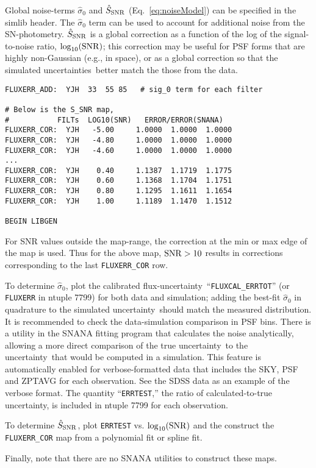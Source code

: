\documentclass[12pt]{article}
\newcommand{\unc}{uncertainty}
\newcommand{\uncs}{uncertainties}
\newcommand{\obs}{observation}
\newcommand{\sigOFF}{\hat\sigma_0}
\newcommand{\SSNR}{\hat{S}_{\rm SNR}}
\newcommand{\logSNR}{\log_{10}({\rm SNR})}
\begin{document}
{Global noise-terms $\sigOFF$ and $\SSNR$ (Eq.~\ref{eq:noiseModel})
can be specified in the simlib header.
The $\sigOFF$ term can be used to account for
additional noise from the SN-photometry.
$\SSNR$ is a global correction as a function of
the log of the signal-to-noise ratio, $\logSNR$;
this correction may be useful for PSF forms
that are highly non-Gaussian (e.g., in space),
or as a global correction so that the simulated
\uncs\ better match the those from the data.

%
\begin{Verbatim}[frame=single]
FLUXERR_ADD:  YJH  33  55 85   # sig_0 term for each filter

# Below is the S_SNR map,
#           FILTs  LOG10(SNR)   ERROR/ERROR(SNANA)
FLUXERR_COR:  YJH   -5.00     1.0000  1.0000  1.0000
FLUXERR_COR:  YJH   -4.80     1.0000  1.0000  1.0000
FLUXERR_COR:  YJH   -4.60     1.0000  1.0000  1.0000
...
FLUXERR_COR:  YJH    0.40     1.1387  1.1719  1.1775
FLUXERR_COR:  YJH    0.60     1.1368  1.1704  1.1751
FLUXERR_COR:  YJH    0.80     1.1295  1.1611  1.1654
FLUXERR_COR:  YJH    1.00     1.1189  1.1470  1.1512

BEGIN LIBGEN
\end{Verbatim}
%
For SNR values outside the map-range, the correction at the 
min or max edge of the map is used.
Thus for the above map, ${\rm SNR} > 10$ results in corrections
corresponding to the last {\tt FLUXERR\_COR} row.

\bigskip
To determine $\sigOFF$, plot the calibrated flux-\unc\ 
``{\tt FLUXCAL\_ERRTOT}'' (or {\tt FLUXERR} in ntuple 7799) 
for both data and simulation; 
adding the best-fit $\sigOFF$ in quadrature to the simulated \unc\ 
should match the measured distribution. It is recommended
to check the data-simulation comparison in PSF bins.
There is a utility in the SNANA fitting program that calculates 
the noise analytically,  allowing a more direct comparison
of the true \unc\ to the \unc\ that would be computed
in a simulation. This feature is automatically enabled
for verbose-formatted data that includes the SKY, PSF and
ZPTAVG for each \obs. See the SDSS data as an example
of the  verbose format. The quantity ``{\tt ERRTEST},''
the ratio of calculated-to-true \unc, is included
in ntuple 7799 for each \obs. 

To determine $\SSNR$, plot {\tt ERRTEST} vs. $\logSNR$
and the construct the {\tt FLUXERR\_COR} map from 
a polynomial fit or spline fit.

Finally, note that there are no SNANA utilities to
construct these maps.

}
\end{document}
